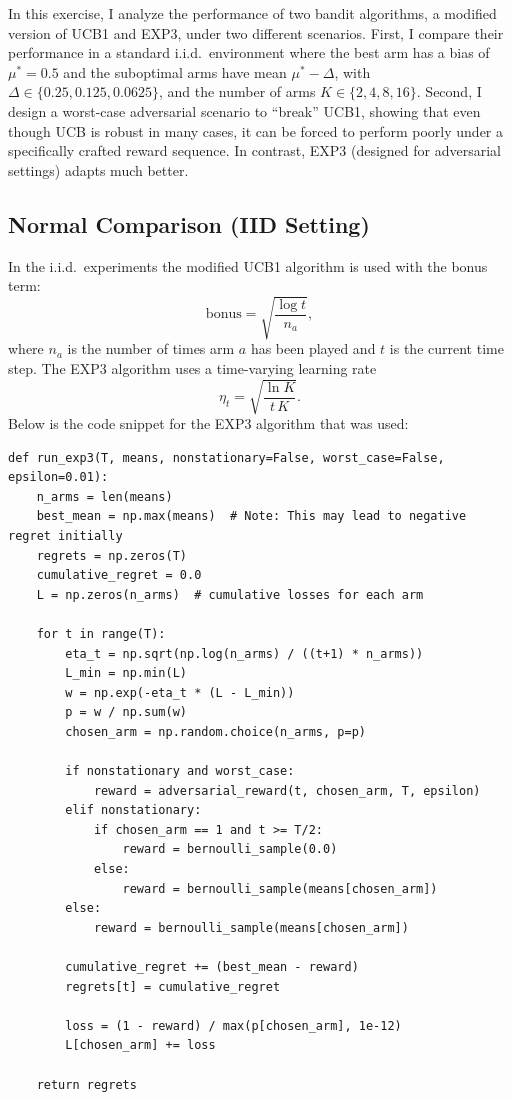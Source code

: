 In this exercise, I analyze the performance of two bandit algorithms, a modified version of UCB1 and EXP3, under two different scenarios. First, I compare their performance in a standard i.i.d.\ environment where the best arm has a bias of $\mu^* = 0.5$ and the suboptimal arms have mean $\mu^*-\Delta$, with $\Delta\in\{0.25,0.125,0.0625\}$, and the number of arms $K\in\{2,4,8,16\}$. Second, I design a worst-case adversarial scenario to ``break'' UCB1, showing that even though UCB is robust in many cases, it can be forced to perform poorly under a specifically crafted reward sequence. In contrast, EXP3 (designed for adversarial settings) adapts much better.

\subsection*{Normal Comparison (IID Setting)}

In the i.i.d.\ experiments the modified UCB1 algorithm is used with the bonus term:
\[
\text{bonus} = \sqrt{\frac{\log t}{n_a}},
\]
where $n_a$ is the number of times arm $a$ has been played and $t$ is the current time step. The EXP3 algorithm uses a time-varying learning rate
\[
\eta_t = \sqrt{\frac{\ln K}{t \, K}}.
\]
Below is the code snippet for the EXP3 algorithm that was used:

\begin{lstlisting}
def run_exp3(T, means, nonstationary=False, worst_case=False, epsilon=0.01):
    n_arms = len(means)
    best_mean = np.max(means)  # Note: This may lead to negative regret initially
    regrets = np.zeros(T)
    cumulative_regret = 0.0
    L = np.zeros(n_arms)  # cumulative losses for each arm

    for t in range(T):
        eta_t = np.sqrt(np.log(n_arms) / ((t+1) * n_arms))
        L_min = np.min(L)
        w = np.exp(-eta_t * (L - L_min))
        p = w / np.sum(w)
        chosen_arm = np.random.choice(n_arms, p=p)
        
        if nonstationary and worst_case:
            reward = adversarial_reward(t, chosen_arm, T, epsilon)
        elif nonstationary:
            if chosen_arm == 1 and t >= T/2:
                reward = bernoulli_sample(0.0)
            else:
                reward = bernoulli_sample(means[chosen_arm])
        else:
            reward = bernoulli_sample(means[chosen_arm])
        
        cumulative_regret += (best_mean - reward)
        regrets[t] = cumulative_regret
        
        loss = (1 - reward) / max(p[chosen_arm], 1e-12)
        L[chosen_arm] += loss

    return regrets
\end{lstlisting}

